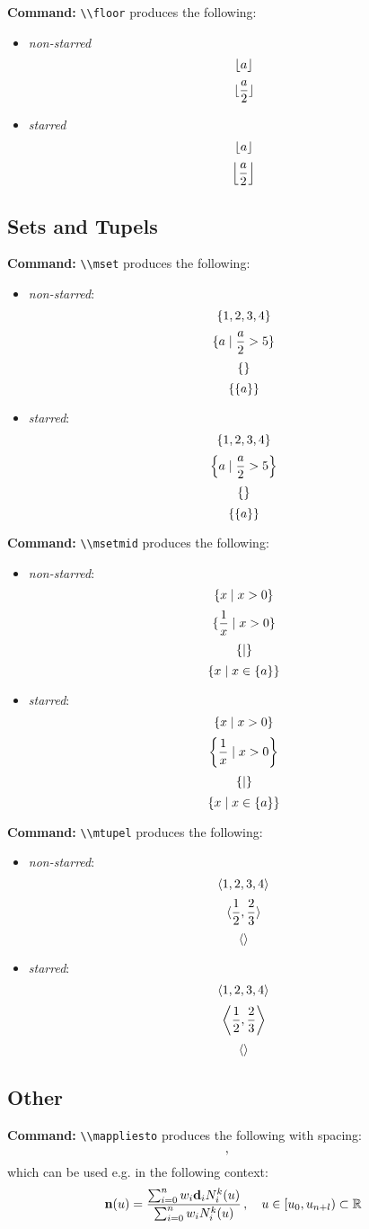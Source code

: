 \documentclass[10pt]{article}
\newcommand{\commandcmd}[1]{\par\noindent\textbf{Command:} \lstinline{\\#1}}
\begin{document}
\commandcmd{floor} produces the following:
\begin{itemize}
  \item \emph{non-starred}
        \[\floor{a}\]
        \[\floor{\frac{a}{2}}\]
  \item \emph{starred}
        \[\floor*{a}\]
        \[\floor*{\frac{a}{2}}\]
\end{itemize}

\subsection{Sets and Tupels}
\commandcmd{mset} produces the following:
\begin{itemize}
  \item \emph{non-starred}:
        \[\mset{1, 2, 3, 4}\]
        \[\mset{a \mid \frac{a}{2} > 5}\]
        \[\mset{}\]
        \[\mset{\mset{a}}\]
  \item \emph{starred}:
        \[\mset*{1, 2, 3, 4}\]
        \[\mset*{a \mid \frac{a}{2} > 5}\]
        \[\mset*{}\]
        \[\mset*{\mset*{a}}\]
\end{itemize}

\commandcmd{msetmid} produces the following:
\begin{itemize}
  \item \emph{non-starred}:
        \[\msetmid{x}{x > 0}\]
        \[\msetmid{\frac{1}{x}}{x > 0}\]
        \[\msetmid{}{}\]
        \[\msetmid{x}{x \in \mset{a}}\]
  \item \emph{starred}:
        \[\msetmid*{x}{x > 0}\]
        \[\msetmid*{\frac{1}{x}}{x > 0}\]
        \[\msetmid*{}{}\]
        \[\msetmid*{x}{x \in \mset{a}}\]
\end{itemize}

\commandcmd{mtupel} produces the following:
\begin{itemize}
  \item \emph{non-starred}:
        \[\mtupel{1, 2, 3, 4}\]
        \[\mtupel{\frac{1}{2}, \frac{2}{3}}\]
        \[\mtupel{}\]
  \item \emph{starred}:
        \[\mtupel*{1, 2, 3, 4}\]
        \[\mtupel*{\frac{1}{2}, \frac{2}{3}}\]
        \[\mtupel*{}\]
\end{itemize}

\subsection{Other}

\commandcmd{mappliesto} produces the following with spacing:
\[\mappliesto\]
which can be used e.g. in the following context:
\[\mathbf{n}(u) = \frac{\sum_{i = 0}^n w_i \mathbf{d}_i N_i^k(u)}{\sum_{i = 0}^n w_i N_i^k(u)} \mappliesto u \in \left[u_0, u_{n + l}\right) \subset \mathbb{R}\]
\end{document}
